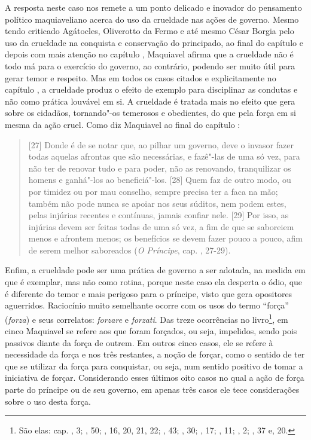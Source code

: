 A resposta neste caso nos remete a um ponto delicado e inovador do
pensamento político maquiaveliano acerca do uso da crueldade nas ações
de governo. Mesmo tendo criticado Agátocles, Oliverotto da Fermo e até
mesmo César Borgia pelo uso da crueldade na conquista e conservação do
principado, ao final do capítulo  e depois com mais atenção no
capítulo , Maquiavel afirma que a crueldade não é todo má para o
exercício do governo, ao contrário, podendo ser muito útil para gerar
temor e respeito. Mas em todos os casos citados e explicitamente no
capítulo , a crueldade produz o efeito de exemplo para disciplinar
as condutas e não como prática louvável em si. A crueldade é tratada
mais no efeito que gera sobre os cidadãos, tornando"-os temerosos e
obedientes, do que pela força em si mesma da ação cruel. Como diz
Maquiavel ao final do capítulo :

\begin{quote}
{[}27{]} Donde é de se notar que, ao pilhar um governo, deve o
invasor fazer todas aquelas afrontas que são necessárias, e fazê"-las de
uma só vez, para não ter de renovar tudo e para poder, não as renovando,
tranquilizar os homens e ganhá"-los ao beneficiá"-los. {[}28{]} Quem faz
de outro modo, ou por timidez ou por mau conselho, sempre precisa ter a
faca na mão; também não pode nunca se apoiar nos seus súditos, nem podem
estes, pelas injúrias recentes e contínuas, jamais confiar nele.
{[}29{]} Por isso, as injúrias devem ser feitas todas de uma só vez, a
fim de que se saboreiem menos e afrontem menos; os benefícios se devem
fazer pouco a pouco, afim de serem melhor saboreados (\emph{O Príncipe},
cap. , 27-29).
\end{quote}

Enfim, a crueldade pode ser uma prática de governo a ser adotada, na
medida em que é exemplar, mas não como rotina, porque neste caso ela
desperta o ódio, que é diferente do temor e mais perigoso para o
príncipe, visto que gera opositores aguerridos. Raciocínio muito
semelhante ocorre com os usos do termo ``força'' (\emph{forza}) e seus
correlatos: \emph{forzare} e \emph{forzati}. Das treze ocorrências no
livro\footnote{São elas: cap. , 3; , 50; , 16, 20, 21, 22; , 43; , 30;
  , 17; , 11; , 2; , 37 e, 20.}, em cinco Maquiavel se refere aos que foram forçados, ou
seja, impelidos, sendo pois passivos diante da força de outrem. Em
outros cinco casos, ele se refere à necessidade da força e nos três
restantes, a noção de forçar, como o sentido de ter que se utilizar da
força para conquistar, ou seja, num sentido positivo de tomar a
iniciativa de forçar. Considerando esses últimos oito casos no qual a
ação de força parte do príncipe ou de seu governo, em apenas três casos
ele tece considerações sobre o uso desta força.

